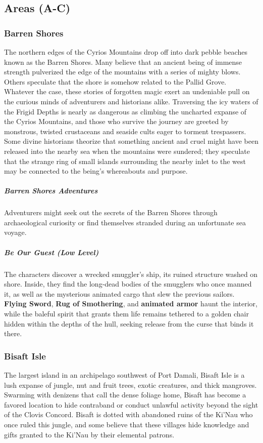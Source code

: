 \documentclass[10pt,a4paper,twoside,bg=print,twocolumn,openany,nodeprecatedcode]{dndbook}
\begin{document}
\subsection{Areas (A-C)}
\subsubsection{Barren Shores}
The northern edges of the Cyrios Mountains drop off into dark pebble beaches known as the Barren Shores. Many believe that an ancient being of immense strength pulverized the edge of the mountains with a series of mighty blows. Others speculate that the shore is somehow related to the Pallid Grove. Whatever the case, these stories of forgotten magic exert an undeniable pull on the curious minds of adventurers and historians alike. Traversing the icy waters of the Frigid Depths is nearly as dangerous as climbing the uncharted expanse of the Cyrios Mountains, and those who survive the journey are greeted by monstrous, twisted crustaceans and seaside cults eager to torment trespassers. Some divine historians theorize that something ancient and cruel might have been released into the nearby sea when the mountains were sundered; they speculate that the strange ring of small islands surrounding the nearby inlet to the west may be connected to the being's whereabouts and purpose.

\subparagraph{Barren Shores Adventures}
Adventurers might seek out the secrets of the Barren Shores through archaeological curiosity or find themselves stranded during an unfortunate sea voyage.

\subparagraph{Be Our Guest (Low Level)}
The characters discover a wrecked smuggler's ship, its ruined structure washed on shore. Inside, they find the long-dead bodies of the smugglers who once manned it, as well as the mysterious animated cargo that slew the previous sailors. \textbf{Flying Sword}, \textbf{Rug of Smothering}, and \textbf{animated armor} haunt the interior, while the baleful spirit that grants them life remains tethered to a golden chair hidden within the depths of the hull, seeking release from the curse that binds it there.

\subsubsection{Bisaft Isle}
The largest island in an archipelago southwest of Port Damali, Bisaft Isle is a lush expanse of jungle, nut and fruit trees, exotic creatures, and thick mangroves. Swarming with denizens that call the dense foliage home, Bisaft has become a favored location to hide contraband or conduct unlawful activity beyond the sight of the Clovis Concord. Bisaft is dotted with abandoned ruins of the Ki'Nau who once ruled this jungle, and some believe that these villages hide knowledge and gifts granted to the Ki'Nau by their elemental patrons.
\end{document}
